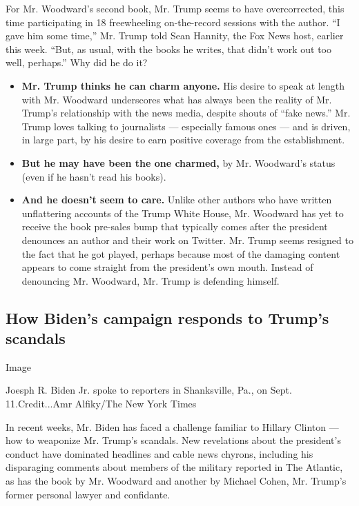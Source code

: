 For Mr. Woodward's second book, Mr. Trump seems to have overcorrected,
this time participating in 18 freewheeling on-the-record sessions with
the author. ``I gave him some time,'' Mr. Trump told Sean Hannity, the
Fox News host, earlier this week. ``But, as usual, with the books he
writes, that didn't work out too well, perhaps.'' Why did he do it?

\begin{itemize}
\item
  \textbf{Mr. Trump thinks he can charm anyone.} His desire to speak at
  length with Mr. Woodward underscores what has always been the reality
  of Mr. Trump's relationship with the news media, despite shouts of
  ``fake news.'' Mr. Trump loves talking to journalists --- especially
  famous ones --- and is driven, in large part, by his desire to earn
  positive coverage from the establishment.
\item
  \textbf{But he may have been the one charmed,} by Mr. Woodward's
  status (even if he hasn't read his books).
\item
  \textbf{And he doesn't seem to care.} Unlike other authors who have
  written unflattering accounts of the Trump White House, Mr. Woodward
  has yet to receive the book pre-sales bump that typically comes after
  the president denounces an author and their work on Twitter. Mr. Trump
  seems resigned to the fact that he got played, perhaps because most of
  the damaging content appears to come straight from the president's own
  mouth. Instead of denouncing Mr. Woodward, Mr. Trump is defending
  himself.
\end{itemize}

\hypertarget{how-bidens-campaign-responds-to-trumps-scandals}{%
\subsection{How Biden's campaign responds to Trump's
scandals}\label{how-bidens-campaign-responds-to-trumps-scandals}}

Image

Joesph R. Biden Jr. spoke to reporters in Shanksville, Pa., on Sept.
11.Credit...Amr Alfiky/The New York Times

In recent weeks, Mr. Biden has faced a challenge familiar to Hillary
Clinton --- how to weaponize Mr. Trump's scandals. New revelations about
the president's conduct have dominated headlines and cable news chyrons,
including his disparaging comments about members of the military
reported in The Atlantic, as has the book by Mr. Woodward and another by
Michael Cohen, Mr. Trump's former personal lawyer and confidante.

